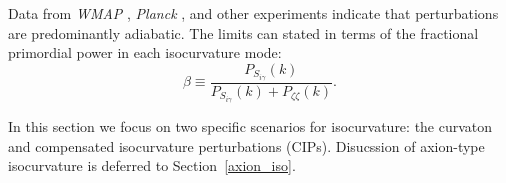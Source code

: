 Data from {\it WMAP\/} \cite{Dunkley:2008ie}, \textit{Planck} \cite{Ade:2015lrj}, and other experiments \cite{Enqvist:2000hp,MacTavish:2005yk} indicate that perturbations are predominantly adiabatic. The limits can stated in terms of the fractional primordial power in each isocurvature mode:\begin{equation}
\beta\equiv \frac{P_{S_{i\gamma}}(k)}{P_{S_{i\gamma}}(k)+P_{\zeta\zeta}(k)}.
\end{equation}

In this section we focus on two specific scenarios for isocurvature: the curvaton and compensated isocurvature perturbations (CIPs). Disucssion of axion-type isocurvature is deferred to Section~\ref{axion_iso}.

